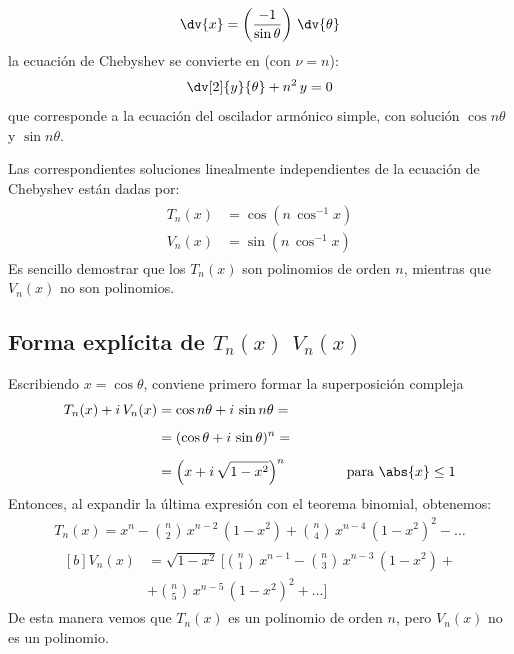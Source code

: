 \begin{align*}
\dv{x} = \left( \dfrac{-1}{\sin \theta} \right) \, \dv{\theta}
\end{align*}
la ecuación de Chebyshev se convierte en (con $\nu = n$):
\begin{align*}
\dv[2]{y}{\theta} + n^{2} \, y = 0
\end{align*}
que corresponde a la ecuación del oscilador armónico simple, con solución $\cos n \theta$ y $\sin n \theta$. 
\par
Las correspondientes soluciones linealmente independientes de la ecuación de Chebyshev están dadas por:
\begin{align}
\begin{aligned}
T_{n} (x) &= \cos (n \, \cos^{-1} x) \\[0.5em]
V_{n} (x) &= \sin (n \, \cos^{-1} x)
\end{aligned}
\label{eq:ecuacion_18_055}
\end{align}
Es sencillo demostrar que los $T_{n} (x)$ son polinomios de orden $n$, mientras que $V_{n} (x)$ no son polinomios.
\subsection{Forma explícita de \texorpdfstring{{$T_{n}(x)$}{}} y \texorpdfstring{{$V_{n}(x)$}{}} .}

Escribiendo $x = \cos \theta$, conviene primero formar la superposición compleja
\begin{align*}
T_{n}(x) + i \, V_{n} (x) &= \cos n \theta + i \, \sin n \theta = \\[0.5em]
&= (\cos \theta + i \, \sin \theta)^{n} = \\[0.5em]
&= \left( x + i \, \sqrt{1- x^{2}} \right)^{n} \hspace{1.5cm} \mbox{para  } \abs{x} \leq 1
\end{align*}
Entonces, al expandir la última expresión con el teorema binomial, obtenemos:
\begin{align}
T_{n}(x) = x^{n} - \binom{n}{2} \, x^{n-2} \, (1 - x^{2}) + \binom{n}{4} \, x^{n-4} \, (1 - x^{2})^{2} - \ldots \label{eq:ecuacion_18_056}
\end{align}
\begin{align}
\begin{aligned}[b]
V_{n}(x) &= \sqrt{1 - x^{2}} \, \bigg[ \binom{n}{1} \, x^{n-1} - \binom{n}{3} \, x^{n-3} \, (1- x^{2}) + \\[0.5em]
&+ \binom{n}{5} \, x^{n-5} \, (1- x^{2})^{2} + \ldots \bigg]
\end{aligned}
\label{eq:ecuacion_18_057}
\end{align}
De esta manera vemos que $T_{n}(x)$ es un polinomio de orden $n$, pero $V_{n}(x)$ no es un polinomio.

